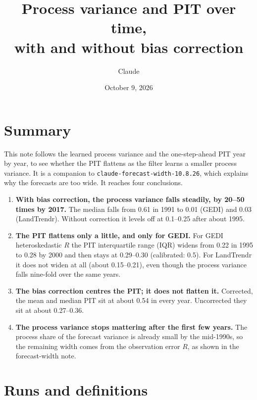 \documentclass[11pt]{article}
\title{Process variance and PIT over time,\\ with and without bias correction}
\author{Claude}
\date{October 9, 2026}
\newcommand{\code}[1]{\texttt{#1}}
\begin{document}
\maketitle

\section*{Summary}

This note follows the learned process variance and the one-step-ahead PIT year by year,
to see whether the PIT flattens as the filter learns a smaller process variance. It is a
companion to \code{claude-forecast-width-10.8.26}, which explains why the forecasts are
too wide. It reaches four conclusions.

\begin{enumerate}
  \item \textbf{With bias correction, the process variance falls steadily, by 20--50 times by 2017.} The median
  falls from 0.61 in 1991 to 0.01 (GEDI) and 0.03 (LandTrendr). Without correction it levels off at
  0.1--0.25 after about 1995.
  \item \textbf{The PIT flattens only a little, and only for GEDI.} For GEDI heteroskedastic
  $R$ the PIT interquartile range (IQR) widens from 0.22 in 1995 to 0.28 by 2000 and then stays at 0.29--0.30
  (calibrated: 0.5). For LandTrendr it does not widen at all (about 0.15--0.21), even though the
  process variance falls nine-fold over the same years.
  \item \textbf{The bias correction centres the PIT; it does not flatten it.} Corrected, the mean and median
  PIT sit at about 0.54 in every year. Uncorrected they sit at about 0.27--0.36.
  \item \textbf{The process variance stops mattering after the first few years.} The process share of the forecast variance
  is already small by the mid-1990s, so the remaining width comes from the
  observation error $R$, as shown in the forecast-width note.
\end{enumerate}

\section{Runs and definitions}
\end{document}
